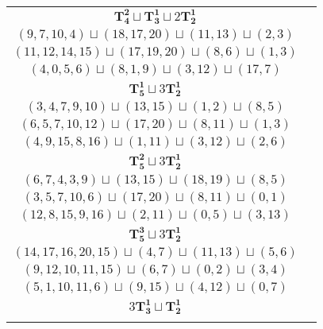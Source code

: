 \documentclass{article}
\begin{document}
\begin{longtable}{|c|c|}
        \hline
        $\mathbf{T_{4}^{2}} \sqcup \mathbf{T_{3}^{1}} \sqcup 2\mathbf{T_{2}^{1}}$ & \begin{tabular}{c}
        $(11,9,12,6)\sqcup(0,1,2)\sqcup(18,15)\sqcup(13,14)$ \\ 
        $(9,7,10,4)\sqcup(18,17,20)\sqcup(11,13)\sqcup(2,3)$ \\ 
        $(11,12,14,15)\sqcup(17,19,20)\sqcup(8,6)\sqcup(1,3)$ \\ 
        $(4,0,5,6)\sqcup(8,1,9)\sqcup(3,12)\sqcup(17,7)$
        \end{tabular} \\ 
        \hline
        $\mathbf{T_{5}^{1}} \sqcup 3\mathbf{T_{2}^{1}}$ & \begin{tabular}{c}
        $(2,4,6,9,12)\sqcup(13,14)\sqcup(18,19)\sqcup(0,1)$ \\ 
        $(3,4,7,9,10)\sqcup(13,15)\sqcup(1,2)\sqcup(8,5)$ \\ 
        $(6,5,7,10,12)\sqcup(17,20)\sqcup(8,11)\sqcup(1,3)$ \\ 
        $(4,9,15,8,16)\sqcup(1,11)\sqcup(3,12)\sqcup(2,6)$
        \end{tabular} \\ 
        \hline
        $\mathbf{T_{5}^{2}} \sqcup 3\mathbf{T_{2}^{1}}$ & \begin{tabular}{c}
        $(11,9,6,4,12)\sqcup(16,15)\sqcup(8,10)\sqcup(2,3)$ \\ 
        $(6,7,4,3,9)\sqcup(13,15)\sqcup(18,19)\sqcup(8,5)$ \\ 
        $(3,5,7,10,6)\sqcup(17,20)\sqcup(8,11)\sqcup(0,1)$ \\ 
        $(12,8,15,9,16)\sqcup(2,11)\sqcup(0,5)\sqcup(3,13)$
        \end{tabular} \\ 
        \hline
        $\mathbf{T_{5}^{3}} \sqcup 3\mathbf{T_{2}^{1}}$ & \begin{tabular}{c}
        $(13,15,16,18,14)\sqcup(9,6)\sqcup(2,4)\sqcup(5,7)$ \\ 
        $(14,17,16,20,15)\sqcup(4,7)\sqcup(11,13)\sqcup(5,6)$ \\ 
        $(9,12,10,11,15)\sqcup(6,7)\sqcup(0,2)\sqcup(3,4)$ \\ 
        $(5,1,10,11,6)\sqcup(9,15)\sqcup(4,12)\sqcup(0,7)$
        \end{tabular} \\ 
        \hline
        $3\mathbf{T_{3}^{1}} \sqcup \mathbf{T_{2}^{1}}$ & \begin{tabular}{c}
        $(18,15,13)\sqcup(11,9,6)\sqcup(0,1,2)\sqcup(16,19)$ \\ 

\end{tabular}
\end{longtable}
\end{document}
